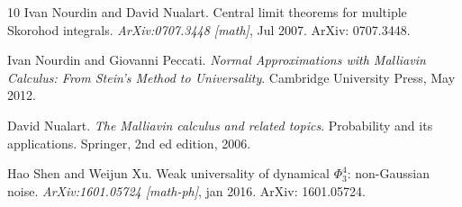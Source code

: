 \documentclass[a4paper,11pt]{article}
\newcommand{\tmtextit}[1]{{\itshape{#1}}}
\begin{document}
\begin{thebibliography}{10}
  Ivan Nourdin  and  David Nualart.
  {\newblock}Central limit theorems for multiple Skorohod integrals.
  {\newblock}\tmtextit{ArXiv:0707.3448 [math]}, Jul 2007. {\newblock}ArXiv:
  0707.3448.{\newblock}
  
  Ivan Nourdin  and  Giovanni Peccati.
  {\newblock}\tmtextit{Normal Approximations with Malliavin Calculus: From
  Stein's Method to Universality}. {\newblock}Cambridge University Press, May
  2012.{\newblock}
  
  David Nualart. {\newblock}\tmtextit{The Malliavin
  calculus and related topics}. {\newblock}Probability and its applications.
  Springer, 2nd ed  edition, 2006.{\newblock}
  
  Hao Shen  and  Weijun Xu. {\newblock}Weak
  universality of dynamical $\Phi^4_3$:
  non-Gaussian noise. {\newblock}\tmtextit{ArXiv:1601.05724 [math-ph]}, jan
  2016. {\newblock}ArXiv: 1601.05724.{\newblock}
\end{thebibliography}


\

\
\end{document}
